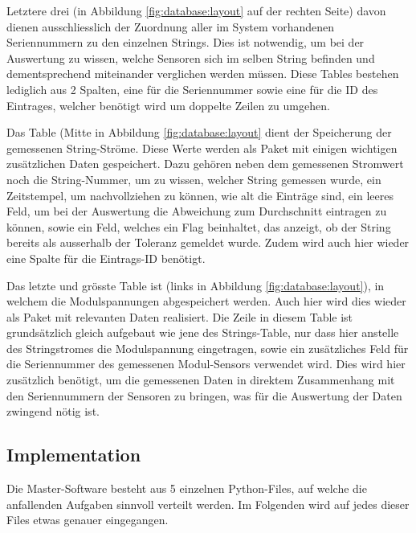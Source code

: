 Letztere drei  (in Abbildung \ref{fig:database:layout} auf  der rechten Seite)
davon  dienen  ausschliesslich  der  Zuordnung  aller  im  System  vorhandenen
Seriennummern  zu  den  einzelnen  Strings. Dies ist  notwendig,  um  bei  der
Auswertung  zu wissen,  welche Sensoren  sich  im selben  String befinden  und
dementsprechend miteinander verglichen  werden m\"ussen. Diese Tables bestehen
lediglich aus 2  Spalten, eine f\"ur die Seriennummer sowie  eine f\"ur die ID
des Eintrages, welcher ben\"otigt wird um doppelte Zeilen zu umgehen.

Das Table   (Mitte in Abbildung  \ref{fig:database:layout} dient
der Speicherung  der gemessenen String-Str\"ome. Diese Werte  werden als Paket
mit einigen  wichtigen zus\"atzlichen Daten gespeichert. Dazu  geh\"oren neben
dem gemessenen Stromwert noch die  String-Nummer, um zu wissen, welcher String
gemessen wurde,  ein Zeitstempel, um  nachvollziehen zu k\"onnen, wie  alt die
Eintr\"age  sind,  ein leeres  Feld,  um  bei  der Auswertung  die  Abweichung
zum  Durchschnitt eintragen  zu k\"onnen,  sowie  ein Feld,  welches ein  Flag
beinhaltet, das  anzeigt, ob  der String bereits  als ausserhalb  der Toleranz
gemeldet wurde. Zudem wird auch hier  wieder eine Spalte f\"ur die Eintrags-ID
ben\"otigt.

Das  letzte  und  gr\"osste  Table   ist    (links  in  Abbildung
\ref{fig:database:layout}),  in  welchem   die  Modulspannungen  abgespeichert
werden. Auch  hier   wird  dies   wieder  als   Paket  mit   relevanten  Daten
realisiert. Die  Zeile in  diesem Table  ist grunds\"atzlich  gleich aufgebaut
wie  jene  des  Strings-Table,  nur   dass  hier  anstelle  des  Stringstromes
die  Modulspannung  eingetragen,  sowie  ein  zus\"atzliches  Feld  f\"ur  die
Seriennummer  des  gemessenen  Modul-Sensors verwendet  wird. Dies  wird  hier
zus\"atzlich ben\"otigt, um die gemessenen Daten in  direktem Zusammenhang mit
den Seriennummern der Sensoren zu bringen,  was f\"ur die Auswertung der Daten
zwingend n\"otig ist.


\subsection{Implementation}
\label{subsec:software:master:implementation}

Die  Master-Software besteht  aus  5 einzelnen  Python-Files,  auf welche  die
anfallenden  Aufgaben sinnvoll  verteilt werden. Im  Folgenden wird  auf jedes
dieser Files etwas genauer eingegangen.


